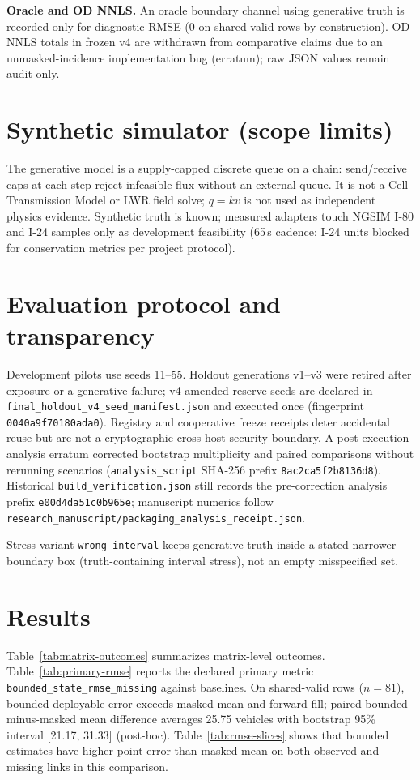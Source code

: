 \documentclass{article}
\begin{document}
\textbf{Oracle and OD NNLS.} An oracle boundary channel using generative truth is recorded only for
diagnostic RMSE ($0$ on shared-valid rows by construction).
OD NNLS totals in frozen v4 are withdrawn from comparative claims due to an unmasked-incidence
implementation bug (erratum); raw JSON values remain audit-only.

\section{Synthetic simulator (scope limits)}
The generative model is a supply-capped discrete queue on a chain: send/receive caps at each step reject
infeasible flux without an external queue.
It is not a Cell Transmission Model or LWR field solve; $q=kv$ is not used as independent physics evidence.
Synthetic truth is known; measured adapters touch NGSIM I-80 and I-24 samples only as development
feasibility (65\,s cadence; I-24 units blocked for conservation metrics per project protocol).

\section{Evaluation protocol and transparency}
Development pilots use seeds 11--55.
Holdout generations v1--v3 were retired after exposure or a generative failure; v4 amended reserve seeds
are declared in \texttt{final\_holdout\_v4\_seed\_manifest.json} and executed once
(fingerprint \texttt{0040a9f70180ada0}).
Registry and cooperative freeze receipts deter accidental reuse but are not a cryptographic cross-host
security boundary.
A post-execution analysis erratum corrected bootstrap multiplicity and paired comparisons without rerunning
scenarios (\texttt{analysis\_script} SHA-256 prefix \texttt{8ac2ca5f2b8136d8}).
Historical \texttt{build\_verification.json} still records the pre-correction analysis prefix
\texttt{e00d4da51c0b965e}; manuscript numerics follow
\texttt{research\_manuscript/packaging\_analysis\_receipt.json}.

Stress variant \texttt{wrong\_interval} keeps generative truth inside a stated narrower boundary box
(truth-containing interval stress), not an empty misspecified set.

\section{Results}
Table~\ref{tab:matrix-outcomes} summarizes matrix-level outcomes.
Table~\ref{tab:primary-rmse} reports the declared primary metric \texttt{bounded\_state\_rmse\_missing} against
baselines.
On shared-valid rows ($n=81$), bounded deployable error exceeds masked mean and forward fill; paired
bounded-minus-masked mean difference averages 25.75 vehicles with bootstrap 95\% interval
[21.17, 31.33] (post-hoc).
Table~\ref{tab:rmse-slices} shows that bounded estimates have higher point error than masked mean on both
observed and missing links in this comparison.
\end{document}
